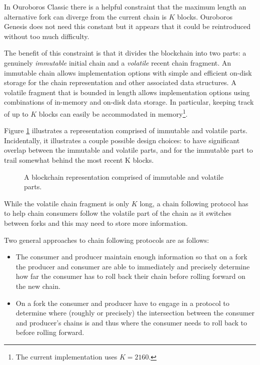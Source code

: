 \documentclass{article}
\theoremstyle{definition}{
  \newtheorem{lemma}{Lemma}[section] %
  \newtheorem{definition}[lemma]{Definition}
}
\theoremstyle{theorem}{
  \newtheorem{invariant}[lemma]{Invariant}
  \newtheorem{proofobligation}[lemma]{Proof Obligation}
}
\numberwithin{equation}{lemma}
\begin{document}
In Ouroboros Classic there is a helpful constraint that the maximum length an
alternative fork can diverge from the current chain is $K$ blocks. Ouroboros
Genesis does not need this constant but it appears that it could be
reintroduced without too much difficulty.

The benefit of this constraint is that it divides the blockchain into
two parts: a genuinely \emph{immutable} initial chain and a
\emph{volatile} recent chain fragment. An immutable chain allows
implementation options with simple and efficient on-disk storage for
the chain representation and other associated data structures. A
volatile fragment that is bounded in length allows implementation
options using combinations of in-memory and on-disk data storage.  In
particular, keeping track of up to $K$ blocks can easily be
accommodated in memory\footnote{The current implementation uses
  $K = 2160$.}.

Figure \ref{chain-diagram-imm-vol} illustrates a representation comprised of
immutable and volatile parts. Incidentally, it illustrates a couple possible
design choices: to have significant overlap between the immutable and volatile
parts, and for the immutable part to trail somewhat behind the most recent K
blocks.

\begin{figure}
\begin{center}
\end{center}
\caption{A blockchain representation comprised of immutable and volatile parts.}
\label{chain-diagram-imm-vol}
\end{figure}

While the volatile chain fragment is only $K$ long, a chain following protocol
has to help chain consumers follow the volatile part of the chain as it
switches between forks and this may need to store more information.

Two general approaches to chain following protocols are as follows:
\begin{itemize}
\item The consumer and producer maintain enough information so that on a fork
      the producer and consumer are able to immediately and precisely determine
      how far the consumer has to roll back their chain before rolling forward
      on the new chain.
\item On a fork the consumer and producer have to engage in a protocol to
      determine where (roughly or precisely) the intersection between the
      consumer and producer's chains is and thus where the consumer needs to
      roll back to before rolling forward.
\end{itemize}
\end{document}
